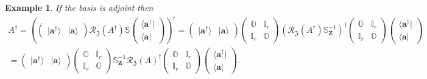 \documentclass[aps, preprint]{revtex4}
\newtheorem{example}[theorem]{Example}
\begin{document}
\begin{example}
If the basis is adjoint then
\begin{gather}A^{ \dag } =\left (\left (\begin{array}{cc}\vert \mathbf{a}^{ \dag } \rangle  & \vert \mathbf{a} \rangle \end{array}\right ) \mathcal{R}_{\mathfrak{Z}} \left (A^{ \dag }\right ) \mathbb{S} \left (\begin{array}{c} \langle \mathbf{a}^{ \dag }\vert  \\
 \langle \mathbf{a}\vert \end{array}\right )\right )^{ \dag } =\left (\begin{array}{cc}\vert \mathbf{a}^{ \dag } \rangle  & \vert \mathbf{a} \rangle \end{array}\right ) \left (\begin{array}{cc}\mathbb{O} & \mathbb{I}_{r} \\
\mathbb{I}_{r} & \mathbb{O}\end{array}\right ) \left (\mathcal{R}_{\mathfrak{Z}} \left (A^{ \dag }\right ) \mathbb{S}_{\mathbf{Z}}^{ -1}\right )^{ \dag } \left (\begin{array}{cc}\mathbb{O} & \mathbb{I}_{r} \\
\mathbb{I}_{r} & \mathbb{O}\end{array}\right ) \left (\begin{array}{c} \langle \mathbf{a}^{ \dag }\vert  \\
 \langle \mathbf{a}\vert \end{array}\right ) \\
 =\left (\begin{array}{cc}\vert \mathbf{a}^{ \dag } \rangle  & \vert \mathbf{a} \rangle \end{array}\right ) \left (\begin{array}{cc}\mathbb{O} & \mathbb{I}_{r} \\
\mathbb{I}_{r} & \mathbb{O}\end{array}\right ) \mathbb{S}_{\mathbf{Z}}^{ -1} \mathcal{R}_{\mathfrak{Z}} \left (A\right )^{ \dag } \left (\begin{array}{cc}\mathbb{O} & \mathbb{I}_{r} \\
\mathbb{I}_{r} & \mathbb{O}\end{array}\right ) \left (\begin{array}{c} \langle \mathbf{a}^{ \dag }\vert  \\
 \langle \mathbf{a}\vert \end{array}\right )\text{.}\end{gather}
\end{example}
\end{document}
